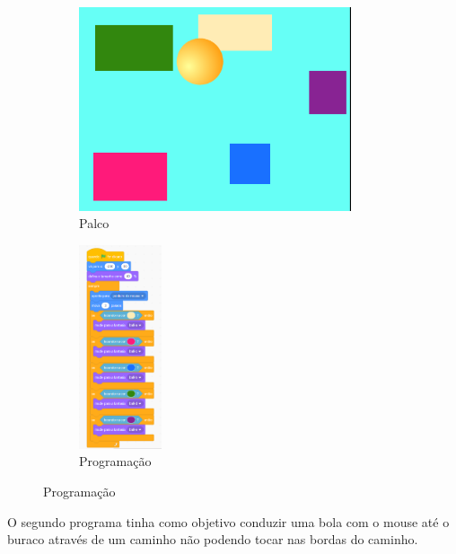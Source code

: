 \documentclass[12pt, openright, a4paper, brazil, english, french, spanish, bibjustif, openany, oneside]{abntex2}
\begin{document}
\begin{figure}[H]

 \centering
 
         \caption{Palco e Programação da bola que muda de cor \label{rec1}}
     \begin{subfigure}[b]{0.3\textwidth}
         \centering
         \includegraphics[height=6cm]{palcorec1.png}
         \caption*{Palco}
         \label{palcorec1}
     \end{subfigure}
     \hfill
     \begin{subfigure}[b]{0.3\textwidth}
         \centering
         \includegraphics[height=6cm]{progrrec1.png}
         \caption*{Programação}
         \label{progrrec1}
     \end{subfigure}   
    
\end{figure}

O segundo programa tinha como objetivo conduzir uma bola com o mouse até o buraco através de um caminho não podendo tocar nas bordas do caminho.
\end{document}

